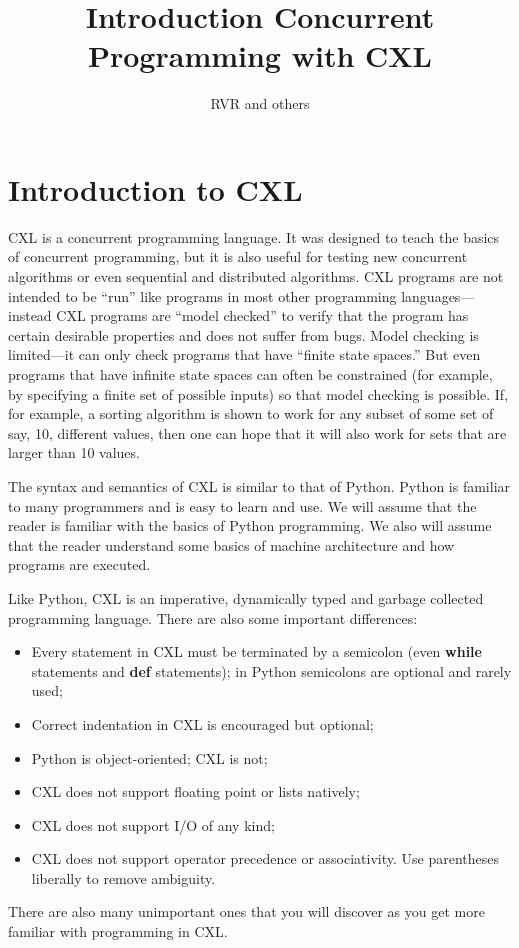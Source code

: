 \documentclass{book}
\title{Introduction Concurrent Programming with CXL}
\author{RVR and others}
\begin{document}
\maketitle

\chapter{Introduction to CXL}

CXL is a concurrent programming language.  It was designed to teach
the basics of concurrent programming, but it is also useful for
testing new concurrent algorithms or even sequential and distributed
algorithms.  CXL programs are not intended to be ``run'' like programs
in most other programming languages---instead CXL programs are
``model checked'' to verify that the program has certain desirable
properties and does not suffer from bugs.  Model checking is
limited---it can only check programs that have ``finite state
spaces.''  But even programs that have infinite state spaces can
often be constrained (for example, by specifying a finite set of
possible inputs) so that model checking is possible.  If, for
example, a sorting algorithm is shown to work for any subset of
some set of say, 10, different values, then one can hope that it
will also work for sets that are larger than 10 values.

The syntax and semantics of CXL is similar to that of Python.
Python is familiar to many programmers and is easy to learn and
use.  We will assume that the reader is familiar with the basics
of Python programming.  We also will assume that the reader
understand some basics of machine architecture and how programs
are executed.

Like Python, CXL is an imperative,
dynamically typed and garbage collected programming language.
There are also some important differences:
\begin{itemize}
\item Every statement in CXL must be terminated by a semicolon
(even \textbf{while} statements and \textbf{def} statements);
in Python semicolons are optional and rarely used;
\item Correct indentation in CXL is encouraged but optional;
\item Python is object-oriented; CXL is not;
\item CXL does not support floating point or lists natively;
\item CXL does not support I/O of any kind;
\item CXL does not support operator precedence or associativity.  Use
parentheses liberally to remove ambiguity.
\end{itemize}
There are also many unimportant ones that you will discover as
you get more familiar with programming in CXL.
\end{document}
